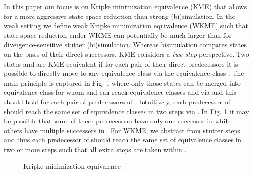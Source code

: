 \documentclass{llncs}
\newcommand{\<}{\langle}
\renewcommand{\>}{\rangle}
\begin{document}
In this paper our focus is on Kripke minimization equivalence (KME) that allows for a more aggressive state space reduction than strong (bi)simulation. In the weak setting we define weak Kripke minimization equivalence (WKME) such that state space reduction under WKME can potentially be much larger than for divergence-sensitive stutter (bi)simulation. Whereas bisimulation compares states on the basis of their direct successors, KME considers a \emph{two-step} perspective. Two states  and  are KME equivalent if for each pair of their direct predecessors it is possible to directly move to any equivalence class via the equivalence class . The main principle is captured in Fig. 1 where only those states can be merged into equivalence class  for whom  and  can reach equivalence classes  and  via  and this should hold for each pair of predecessors of . Intuitively, each predecessor of  should reach the same set of equivalence classes in two steps via . In Fig. 1 it may be possible that some of these predecessors have only one successor in  while others have multiple successors in . For WKME, we abstract from stutter steps and thus each predecessor of  should reach the same set of equivalence classes in two or more steps such that all extra steps are taken within .    
\begin{figure}
 \centering
{}
\caption{Kripke minimization equivalence}
\end{figure} 
\end{document}

